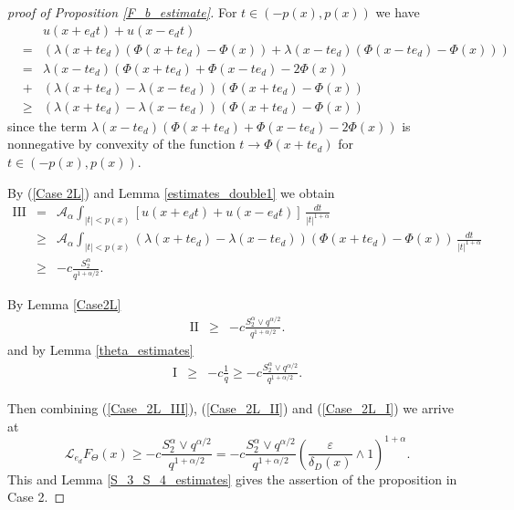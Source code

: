 \documentclass[a4paper,12pt,reqno]{amsart}
\theoremstyle{definition}
\theoremstyle{remark}
\newcommand{\eps}{\varepsilon}
\newcommand{\calA}{\mathcal{A}}
\newcommand{\calL}{\mathcal{L}}
\begin{document}
\begin{proof}[proof of Proposition \ref{F_b_estimate}]
For $t \in (-p(x), p(x))$ we have
\begin{eqnarray}
\nonumber &&u(x + e_d t) + u(x - e_d t)\\
\nonumber
&=& \left(\lambda(x + t e_d) (\varPhi(x + t e_d) - \varPhi(x)) 
+ \lambda(x - t e_d) (\varPhi(x - t e_d) - \varPhi(x))\right)\\
\nonumber
&=& \lambda(x - t e_d) \left(\varPhi(x + t e_d) + \varPhi(x - t e_d) - 2 \varPhi(x)\right)\\
\nonumber
&+& \left(\lambda(x + t e_d) - \lambda(x - t e_d)  \right) \left(\varPhi(x + t e_d) - \varPhi(x) \right)\\
&\ge&  \left(\lambda(x + t e_d) - \lambda(x - t e_d)  \right) \left(\varPhi(x + t e_d) - \varPhi(x) \right) \label{Case 2L}
\end{eqnarray}
since the term $\lambda(x - t e_d) \left(\varPhi(x + t e_d) + \varPhi(x - t e_d) - 2 \varPhi(x)\right)$ is nonnegative by 
convexity of the function $t\to \varPhi(x + t e_d)$ for $t \in (-p(x), p(x))$.


By (\ref{Case 2L}) and Lemma \ref{estimates_double1}   we obtain
\begin{eqnarray}
\nonumber
\text{III} &=&
\calA_{\alpha}  \int_{|t| < p(x)} \left[u(x + e_d t) + u(x - e_d t) \right] \, \frac{dt}{|t|^{1 + \alpha}}\\
\nonumber
&\ge& \calA_{\alpha}  \int_{|t| < p(x)} \left(\lambda(x + t e_d) - \lambda(x - t e_d)  \right) \left(\varPhi(x + t e_d) - \varPhi(x) \right) \, \frac{dt}{|t|^{1 + \alpha}}\\
\label{Case_2L_III}
&\ge& -c\frac{S_2^\alpha }{q^{1+\alpha/2}}.
\end{eqnarray}

By  Lemma \ref{Case2L} 
\begin{eqnarray}
\label{Case_2L_II}
\text{II} 
 &\ge& -c\frac{S_2^\alpha \vee q^{\alpha/2}}{q^{1+\alpha/2}}.
\end{eqnarray}
and by  Lemma \ref{theta_estimates}
\begin{eqnarray}
\label{Case_2L_I}
\text{I} 
 &\ge& -c \frac1q\ge -c\frac{S_2^\alpha \vee q^{\alpha/2}}{q^{1+\alpha/2}}.
\end{eqnarray}

Then combining   (\ref{Case_2L_III}), (\ref{Case_2L_II}) and  (\ref{Case_2L_I}) we arrive at
$$\calL_{e_d} F_{\Theta}(x)\ge -c\frac{S_2^\alpha \vee q^{\alpha/2}}{q^{1+\alpha/2}} 
= - c \frac{S_2^\alpha \vee q^{\alpha/2}}{q^{1+\alpha/2}} \left(\frac{\eps}{\delta_D(x)} \wedge 1\right)^{1 + \alpha}.$$
This and Lemma \ref{S_3_S_4_estimates} gives the assertion of the proposition in Case 2.
\end{proof}
\end{document}
